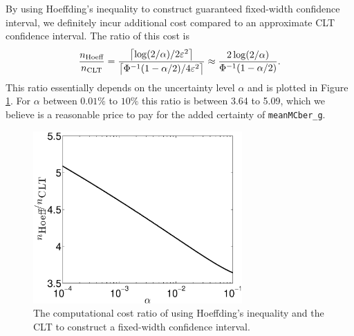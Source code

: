 \documentclass{iitthesis}
\begin{document}
By using Hoeffding's inequality to construct guaranteed fixed-width confidence interval, we definitely incur additional cost compared to an approximate CLT confidence interval.  The ratio of this cost is 
\begin{equation}
\frac{n_{\text{Hoeff}}}{n_{\text{CLT}}} = \frac{\left \lceil \log(2/\alpha)/{2\varepsilon^2} \right \rceil}{\left \lceil{ \Phi^{-1}(1-\alpha/2)}/{4 \varepsilon^2}\right\rceil} \approx  \frac{2\log(2/\alpha)}{\Phi^{-1}(1-\alpha/2)}.
\end{equation}
This ratio essentially depends on the uncertainty level $\alpha$ and is plotted in Figure \ref{fig:ratiovsalpha}. For $\alpha$ between $0.01\%$ to $10\%$ this ratio is between 3.64 to 5.09, which we believe is a reasonable price to pay for the added certainty of {\tt meanMCber\_g}.

  \begin{figure}[htbp]
    \centering
    \includegraphics[width=8cm]{plotHoeffCLTr.eps} %
    \caption{The computational cost ratio of using Hoeffding's inequality and the CLT to construct a fixed-width confidence interval.}
    \label{fig:ratiovsalpha}
 \end{figure}
 
 
 
\end{document}
